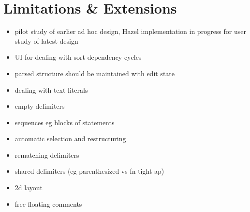 \section{Limitations \& Extensions}


\begin{itemize}
\item pilot study of earlier ad hoc design, Hazel implementation in progress for user study of latest design
\item UI for dealing with sort dependency cycles
\item parsed structure should be maintained with edit state
\item dealing with text literals
\item empty delimiters
\item sequences eg blocks of statements
\item automatic selection and restructuring
\item rematching delimiters
\item shared delimiters (eg parenthesized vs fn tight ap)
\item 2d layout
\item free floating comments
\end{itemize}